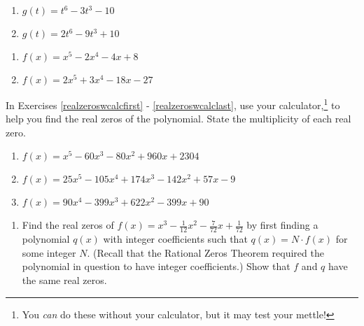 \begin{multicols}{2}
\begin{enumerate}
\setcounter{enumi}{\value{HW}}

\item $g(t) = t^6-3t^3-10$
\item $g(t) = 2t^6-9t^3+10$

\setcounter{HW}{\value{enumi}}
\end{enumerate}
\end{multicols}

\begin{multicols}{2}
\begin{enumerate}
\setcounter{enumi}{\value{HW}}

\item $f(x) = x^5-2x^4-4x+8$
\item $f(x) = 2x^5+3x^4-18x-27$ \label{findrealzerosexerlast}

\setcounter{HW}{\value{enumi}}
\end{enumerate}
\end{multicols}

\pagebreak

In Exercises \ref{realzeroswcalcfirst} - \ref{realzeroswcalclast}, use your calculator,\footnote{You \textit{can} do these without your calculator, but it may test your mettle!} to help you find the real zeros of the polynomial.  State the multiplicity of each real zero.

\begin{enumerate}
\setcounter{enumi}{\value{HW}}

\item $f(x) = x^{5} - 60x^{3} - 80x^{2} + 960x + 2304$ \label{realzeroswcalcfirst}
\item $f(x) = 25x^{5} - 105x^{4} + 174x^{3} - 142x^{2} + 57x - 9$
\item $f(x) = 90x^{4} - 399x^{3} + 622x^{2} - 399x + 90$ \label{realzeroswcalclast}

\setcounter{HW}{\value{enumi}}
\end{enumerate}

\begin{enumerate}
\setcounter{enumi}{\value{HW}}

\item Find the real zeros of $f(x) = x^{3} - \frac{1}{12}x^{2} - \frac{7}{72}x + \frac{1}{72}$ by first finding a polynomial $q(x)$ with integer coefficients such that $q(x) = N \cdot f(x)$ for some integer $N$.  (Recall that the Rational Zeros Theorem required the polynomial in question to have integer coefficients.) Show that $f$ and $q$ have the same real zeros.

\setcounter{HW}{\value{enumi}}
\end{enumerate}

